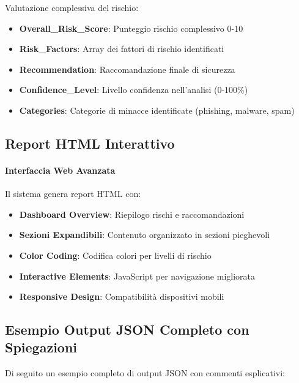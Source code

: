\documentclass{article}
\begin{document}
Valutazione complessiva del rischio:

\begin{itemize}
    \item \textbf{Overall\_Risk\_Score}: Punteggio rischio complessivo 0-10
    \item \textbf{Risk\_Factors}: Array dei fattori di rischio identificati
    \item \textbf{Recommendation}: Raccomandazione finale di sicurezza
    \item \textbf{Confidence\_Level}: Livello confidenza nell'analisi (0-100\%)
    \item \textbf{Categories}: Categorie di minacce identificate (phishing, malware, spam)
\end{itemize}

\subsection{Report HTML Interattivo}

\paragraph{Interfaccia Web Avanzata}

Il sistema genera report HTML con:

\begin{itemize}
    \item \textbf{Dashboard Overview}: Riepilogo rischi e raccomandazioni
    \item \textbf{Sezioni Expandibili}: Contenuto organizzato in sezioni pieghevoli
    \item \textbf{Color Coding}: Codifica colori per livelli di rischio
    \item \textbf{Interactive Elements}: JavaScript per navigazione migliorata
    \item \textbf{Responsive Design}: Compatibilità dispositivi mobili
\end{itemize}

\subsection{Esempio Output JSON Completo con Spiegazioni}

Di seguito un esempio completo di output JSON con commenti esplicativi:
\end{document}
